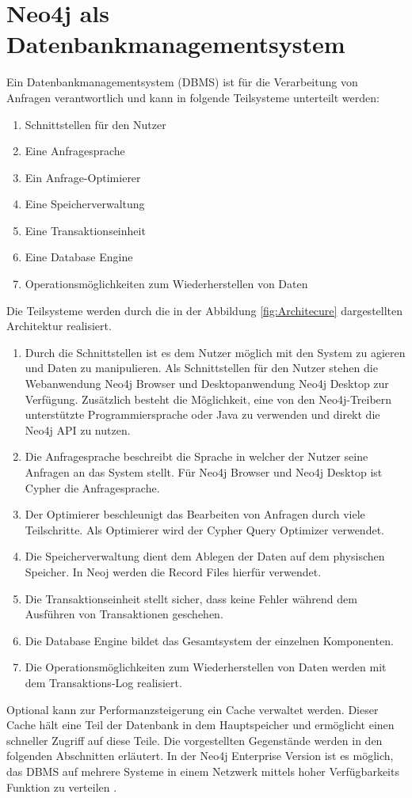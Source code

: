 \section{Neo4j als Datenbankmanagementsystem}
Ein Datenbankmanagementsystem (DBMS) ist für die Verarbeitung von Anfragen verantwortlich und kann in folgende Teilsysteme unterteilt werden\parencite{angles2012comparison}:
\begin{enumerate}
	\item Schnittstellen für den Nutzer
	\item Eine Anfragesprache
	\item Ein Anfrage-Optimierer
	\item Eine Speicherverwaltung
	\item Eine Transaktionseinheit
	\item Eine Database Engine
	\item Operationsmöglichkeiten zum Wiederherstellen von Daten
\end{enumerate}
Die Teilsysteme werden durch die in der Abbildung \ref{fig:Architecure} dargestellten Architektur realisiert.
\begin{enumerate}
	\item Durch die Schnittstellen ist es dem Nutzer möglich mit den System zu agieren und Daten zu manipulieren. Als Schnittstellen für den Nutzer stehen die Webanwendung Neo4j Browser und Desktopanwendung Neo4j Desktop zur Verfügung. Zusätzlich besteht die Möglichkeit, eine von den Neo4j-Treibern unterstützte Programmiersprache  oder  Java zu verwenden und direkt die Neo4j API zu nutzen. 
	\item
	Die Anfragesprache  beschreibt die Sprache in welcher der Nutzer seine Anfragen an das System stellt. Für Neo4j Browser und Neo4j Desktop ist Cypher die Anfragesprache.
	\item Der Optimierer beschleunigt das Bearbeiten von Anfragen durch viele Teilschritte. Als Optimierer wird der Cypher Query Optimizer verwendet\parencite{Optimizer}. 
	\item Die Speicherverwaltung dient dem Ablegen der Daten auf dem physischen Speicher. In Neoj werden die Record Files hierfür verwendet.
	\item Die Transaktionseinheit stellt sicher, dass keine Fehler während dem Ausführen von Transaktionen geschehen. 
	\item Die Database Engine bildet das Gesamtsystem der einzelnen Komponenten.\item Die Operationsmöglichkeiten zum Wiederherstellen von Daten werden mit dem Transaktions-Log realisiert.
\end{enumerate}
Optional kann zur  Performanzsteigerung ein Cache verwaltet werden. Dieser Cache hält eine Teil der Datenbank in dem Hauptspeicher und ermöglicht einen schneller Zugriff auf diese Teile. Die vorgestellten Gegenstände werden in den folgenden Abschnitten erläutert. In der Neo4j Enterprise Version ist es möglich, das DBMS auf mehrere Systeme in einem Netzwerk mittels hoher Verfügbarkeits Funktion zu verteilen \parencite{vukotic2015neo4j}.

